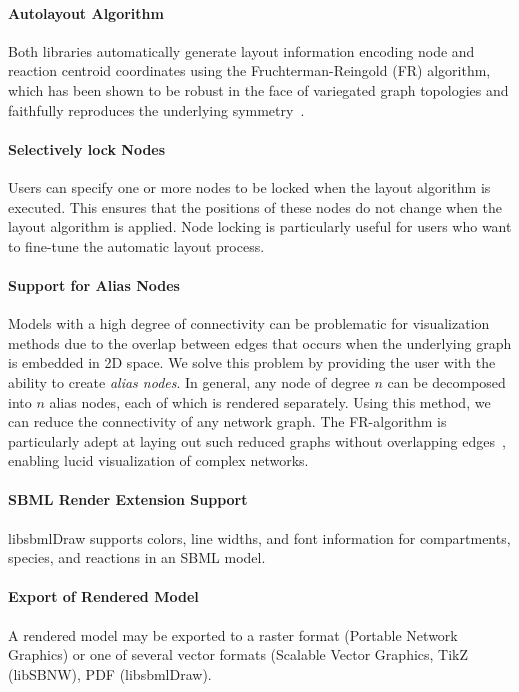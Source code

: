 \documentclass{bioinfo}
\begin{document}
\paragraph{Autolayout Algorithm}
Both libraries automatically generate layout information encoding 
node and reaction centroid coordinates using the Fruch\-terman-Reingold (FR) algorithm, which has been shown to be robust in the face of variegated graph topologies and faithfully reproduces the underlying symm\-etry~\citep{FruchtermanReingold}. 

\paragraph{Selectively lock Nodes} Users can specify one or more nodes to be locked when the layout algorithm is executed. This ensures that the positions of these nodes do not change when the layout algorithm is applied.
Node locking is particularly useful for users who want to fine-tune the automatic layout process.

\paragraph{Support for Alias Nodes}
Models with a high degree of connectivity can be problematic for visualization
methods due to the overlap between edges that occurs when the underlying 
graph is embedded in 2D space.
We solve this problem by providing the user
with the ability to create \textit{alias nodes}. In general, any node of degree
$n$ can be decomposed into $n$ alias nodes, each of which is rendered separately.
Using this method, we can reduce the connectivity of any network graph.
The FR-algorithm is particularly adept at laying out such reduced graphs without overlapping edges~\citep{FruchtermanReingold}, 
enabling lucid visualization of complex networks.

\paragraph{SBML Render Extension Support} 
libsbmlDraw supports colors, line widths, and font information for compartments, species, and reactions in an SBML model.

\paragraph{Export of Rendered Model}
A rendered model may be exported to a raster format (Portable Network Graphics) or one of several vector formats (Scalable Vector Graphics, TikZ (libSBNW), PDF (libsbmlDraw). 
\end{document}
